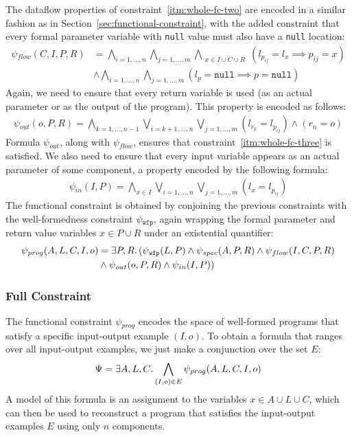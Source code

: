 The dataflow properties of constraint~\ref{itm:whole-fc-two} are encoded in a
similar fashion as in Section~\ref{sec:functional-constraint}, with the added
constraint that every formal parameter variable with \lstinline{null} value must
also have a \lstinline{null} location:
%
\begin{align*}
  \psi{}_{flow}(C,I,P,R)
  &=\bigwedge_{i=1,\ldots,n}
    \bigwedge_{j=1,\ldots,m}
    \bigwedge_{\substack{x \in I \cup C \cup R}}
    (l_{p_{ij}} = l_x \implies p_{ij} = x) \\
  &\wedge\bigwedge_{i=1,\ldots,n}
    \bigwedge_{j=1,\ldots,m}
    (l_p = \mathtt{null} \implies p = \mathtt{null})
\end{align*}
%
\noindent
Again, we need to ensure that every return variable is used (as an actual
parameter or as the output of the program).
This property is encoded as follows:
%
\begin{align*}
  \psi{}_{out}(o, P, R)
  =\bigwedge_{k=1,\ldots,n-1}
    \bigvee_{i=k+1,\ldots,n}
    \bigvee_{j=1,\ldots,m}
    (l_{r_k} = l_{p_{ij}})
  \wedge (r_n = o)
\end{align*}
%
\noindent
Formula $\psi{}_{out}$, along with $\psi{}_{flow}$, ensures that
constraint~\ref{itm:whole-fc-three} is satisfied.
We also need to ensure that every input variable appears as an actual parameter
of some component, a property encoded by the following formula:
%
\begin{align*}
  \psi{}_{in}(I, P)
  =\bigwedge_{x \in I}
    \bigvee_{i=1,\ldots,n}
    \bigvee_{j=1,\ldots,m}
    (l_{x} = l_{p_{ij}})
\end{align*}
%
The functional constraint is obtained by conjoining the previous constraints
with the well-formedness constraint $\psi{}_{\mathtt{wfp}}$,
again wrapping the formal parameter and return value variables $x \in P \cup R$
under an existential quantifier:
%
\begin{align*}
  \psi{}_{prog}(A,L,C,I,o) &= \exists P,R\ldotp
  (\psi{}_{\mathtt{wfp}}(L, P) \wedge
  \psi{}_{spec}(A, P, R) \wedge
  \psi{}_{flow}(I, C, P, R)\\&\wedge 
  \psi{}_{out}(o, P, R) \wedge
  \psi{}_{in}(I, P))
\end{align*}

\subsubsection{Full Constraint}
\label{sec:whole-full-constraint}

The functional constraint $\psi{}_{prog}$ encodes the space of well-formed
programs that satisfy a specific input-output example $(I, o)$.
To obtain a formula that ranges over all input-output examples, we just make a
conjunction over the set $E$:
%
\[
  \Psi{}=\exists{A,L,C}\ldotp\bigwedge_{(I, o) \in E}\psi{}_{prog}(A,L,C,I,o)
\]
%
\noindent
A model of this formula is an assignment to the variables $x \in A \cup L \cup C$,
which can then be used to reconstruct a program that satisfies the input-output
examples $E$ using only $n$ components.